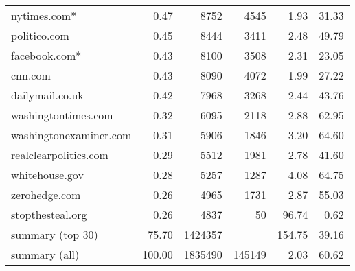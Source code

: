 \begin{tabular}{lrrrrr}
nytimes.com*           &    0.47 &     8752 &    4545 &         1.93 &         31.33 \\
politico.com           &    0.45 &     8444 &    3411 &         2.48 &         49.79 \\
facebook.com*          &    0.43 &     8100 &    3508 &         2.31 &         23.05 \\
cnn.com                &    0.43 &     8090 &    4072 &         1.99 &         27.22 \\
dailymail.co.uk        &    0.42 &     7968 &    3268 &         2.44 &         43.76 \\
washingtontimes.com    &    0.32 &     6095 &    2118 &         2.88 &         62.95 \\
washingtonexaminer.com &    0.31 &     5906 &    1846 &         3.20 &         64.60 \\
realclearpolitics.com  &    0.29 &     5512 &    1981 &         2.78 &         41.60 \\
whitehouse.gov         &    0.28 &     5257 &    1287 &         4.08 &         64.75 \\
zerohedge.com          &    0.26 &     4965 &    1731 &         2.87 &         55.03 \\
stopthesteal.org       &    0.26 &     4837 &      50 &        96.74 &          0.62 \\
summary (top 30)       &   75.70 &  1424357 &         &       154.75 &         39.16 \\
summary (all)          &  100.00 &  1835490 &  145149 &         2.03 &         60.62 \\
\bottomrule
\end{tabular}
